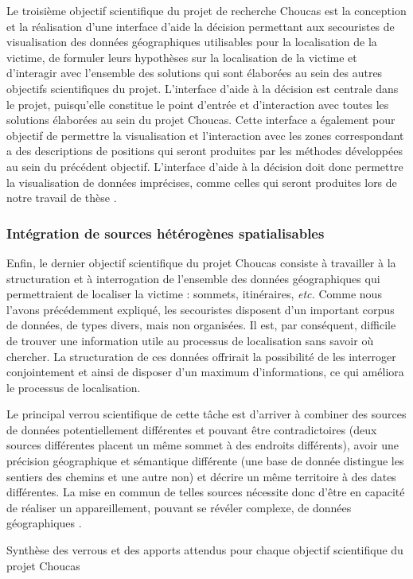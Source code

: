 Le troisième objectif scientifique du projet de recherche Choucas est
la conception et la réalisation d'une interface d'aide la décision
permettant aux secouristes de visualisation des données géographiques
utilisables pour la localisation de la victime, de formuler leurs
hypothèses sur la localisation de la victime et d’interagir avec
l'ensemble des solutions qui sont élaborées au sein des autres
objectifs scientifiques du projet. L'interface d'aide à la décision
est centrale dans le projet, puisqu'elle constitue le point d'entrée
et d'interaction avec toutes les solutions élaborées au sein du projet
Choucas. Cette interface a également pour objectif de permettre la
visualisation et l'interaction avec les zones correspondant a des
descriptions de positions qui seront produites par les méthodes
développées au sein du précédent objectif. L'interface d'aide à la
décision doit donc permettre la visualisation de données imprécises,
comme celles qui seront produites lors de notre travail de thèse
\autocite{Viry2019a}.

\subsubsection{Intégration de sources hétérogènes spatialisables}
\label{subsec:1-2-3-4}

Enfin, le dernier objectif scientifique du projet Choucas consiste à
travailler à la structuration et à interrogation de l'ensemble des
données géographiques qui permettraient de localiser la victime :
sommets, itinéraires, \emph{etc.} Comme nous l'avons précédemment
expliqué, les secouristes disposent d'un important corpus de données,
de types divers, mais non organisées. Il est, par conséquent,
difficile de trouver une information utile au processus de
localisation sans savoir où chercher. La structuration de ces données
offrirait la possibilité de les interroger conjointement et ainsi de
disposer d'un maximum d'informations, ce qui améliora le processus de
localisation.

Le principal verrou scientifique de cette tâche est d'arriver à
combiner des sources de données potentiellement différentes et pouvant
être contradictoires (\eg deux sources différentes placent un même
sommet à des endroits différents), avoir une précision géographique et
sémantique différente (\eg une base de donnée distingue les sentiers
des chemins et une autre non) et décrire un même territoire à des
dates différentes. La mise en commun de telles sources nécessite donc
d'être en capacité de réaliser un appareillement, pouvant se révéler
complexe, de données géographiques
\autocite{VanDamme2019,Halilali2018}.

\begin{landscape}
\begin{table}[H]
  \centering
  
  \caption{Synthèse des verrous et des apports attendus pour chaque
    objectif scientifique du projet Choucas}
  \label{tab:synthese_objectifs_choucas}
\end{table}
\end{landscape}

